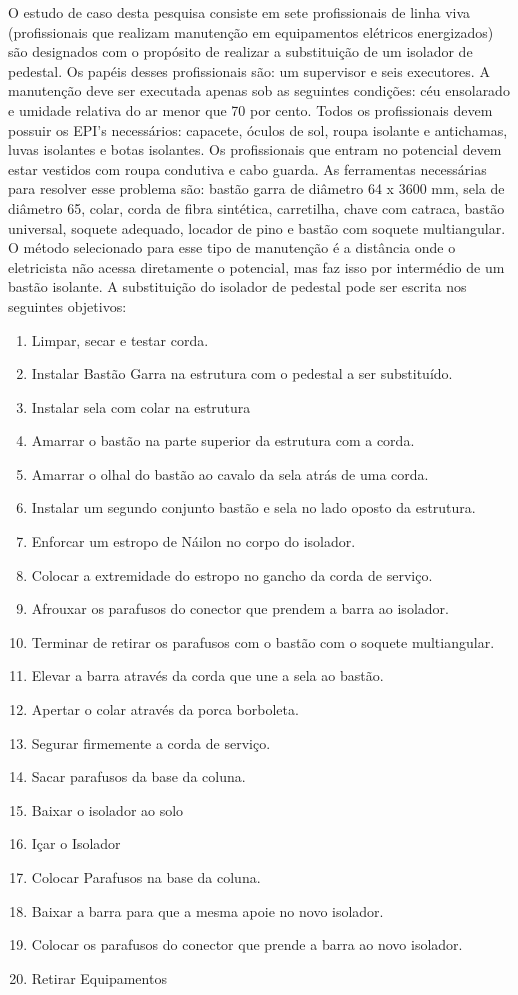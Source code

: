 O estudo de caso desta pesquisa consiste em sete profissionais de linha viva (profissionais que realizam manutenção em equipamentos elétricos energizados) são designados com o propósito de realizar a substituição de um isolador de pedestal. Os papéis desses profissionais são: um supervisor e seis executores. A manutenção deve ser executada apenas sob as seguintes condições: céu ensolarado e umidade relativa do ar menor que 70 por cento. Todos os profissionais devem possuir os EPI's necessários: capacete, óculos de sol, roupa isolante e antichamas, luvas isolantes e botas isolantes. Os profissionais que entram no potencial devem estar vestidos com roupa condutiva e cabo guarda. As ferramentas necessárias para resolver esse problema são: bastão garra de diâmetro 64 x 3600 mm, sela de diâmetro 65, colar, corda de fibra sintética, carretilha, chave com catraca, bastão universal, soquete adequado, locador de pino e bastão com soquete multiangular. O método selecionado para esse tipo de manutenção é a distância onde o eletricista não acessa diretamente o potencial, mas faz isso por intermédio de um bastão isolante. A substituição do isolador 
de pedestal pode ser escrita nos seguintes objetivos: 

\begin{enumerate}
	\item Limpar, secar e testar corda.
	\item Instalar Bastão Garra na estrutura com o pedestal a ser substituído.
	\item Instalar sela com colar na estrutura
	\item Amarrar o bastão na parte superior da estrutura com a corda.
	\item Amarrar o olhal do bastão ao cavalo da sela atrás de uma corda.
	\item Instalar um segundo conjunto bastão e sela no lado oposto da estrutura.
	\item Enforcar um estropo de Náilon no corpo do isolador.
	\item Colocar a extremidade do estropo no gancho da corda de serviço.
	\item Afrouxar os parafusos do conector que prendem a barra ao isolador.
	\item Terminar de retirar os parafusos com o bastão com o soquete multiangular.
	\item Elevar a barra através da corda que une a sela ao bastão.
	\item Apertar o colar através da porca borboleta.
	\item Segurar firmemente a corda de serviço.
	\item Sacar parafusos da base da coluna.
	\item Baixar o isolador ao solo
	\item Içar o Isolador
	\item Colocar Parafusos na base da coluna.
	\item Baixar a barra para que a mesma apoie no novo isolador.
	\item Colocar os parafusos do conector que prende a barra ao novo isolador. 
	\item Retirar Equipamentos
\end{enumerate}


